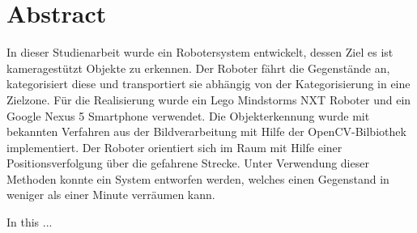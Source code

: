 \chapter*{Abstract}

In dieser Studienarbeit wurde ein Robotersystem entwickelt, dessen Ziel es ist kameragestützt Objekte zu erkennen. Der Roboter fährt die Gegenstände an, kategorisiert diese und transportiert sie abhängig von der Kategorisierung in eine Zielzone. Für die Realisierung wurde ein Lego Mindstorms NXT Roboter und ein Google Nexus 5 Smartphone verwendet. Die Objekterkennung wurde mit bekannten Verfahren aus der Bildverarbeitung mit Hilfe der OpenCV-Bilbiothek implementiert. Der Roboter orientiert sich im Raum mit Hilfe einer Positionsverfolgung über die gefahrene Strecke. Unter Verwendung dieser Methoden konnte ein System entworfen werden, welches einen Gegenstand in weniger als einer Minute verräumen kann.

In this ...
